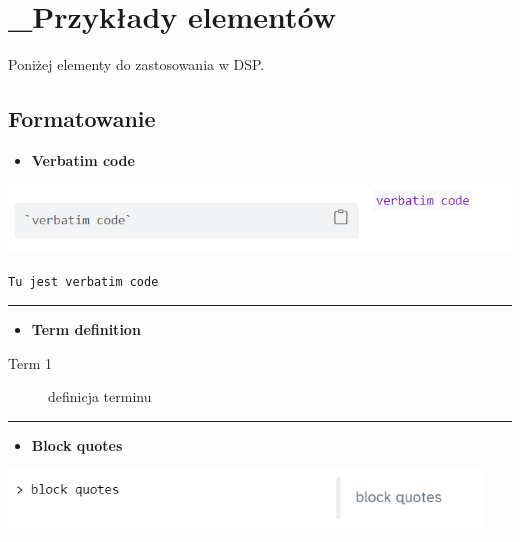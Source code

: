 \documentclass[
  a4paper,
  DIV=11,
  numbers=noendperiod,
  oneside,
  open=any]{scrreprt}
\providecommand{\tightlist}{%
  \setlength{\itemsep}{0pt}\setlength{\parskip}{0pt}}\usepackage{longtable,booktabs,array}
\begin{document}

\chapter{\_Przykłady elementów}\label{przykux142ady-elementuxf3w}

Poniżej elementy do zastosowania w DSP.

\section{Formatowanie}\label{formatowanie}

\begin{itemize}
\tightlist
\item
  \textbf{Verbatim code}
\end{itemize}

\includegraphics[width=5.375in,height=\textheight]{images/_format_verbatim.png}

\texttt{Tu\ jest\ verbatim\ code}

\begin{center}\rule{0.5\linewidth}{0.5pt}\end{center}

\begin{itemize}
\tightlist
\item
  \textbf{Term definition}
\end{itemize}

\begin{description}
\item[Term 1]
definicja terminu
\end{description}

\begin{center}\rule{0.5\linewidth}{0.5pt}\end{center}

\begin{itemize}
\tightlist
\item
  \textbf{Block quotes}
\end{itemize}

\includegraphics[width=4.97917in,height=\textheight]{images/clipboard-169377371.png}
\end{document}
